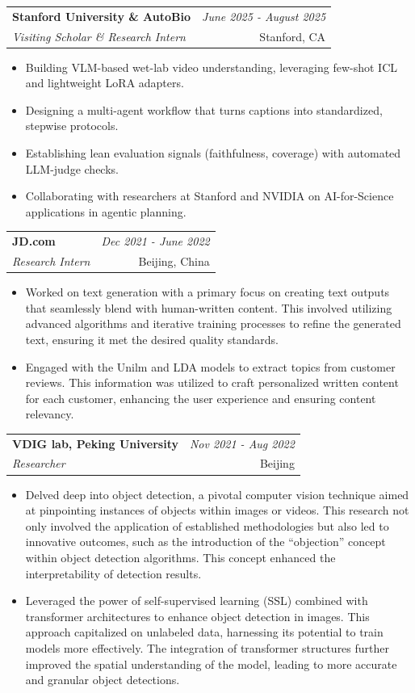 \documentclass[a4paper,11pt]{article}
\makeatletter
\newcommand{\resumeSubheading}[4]{
\vspace{0.5mm}\item
    \begin{tabular*}{0.98\textwidth}[t]{l@{\extracolsep{\fill}}r}
        \textbf{#1} & \textit{\footnotesize{#4}} \\
        \textit{\footnotesize{#3}} &  \footnotesize{#2}\\
    \end{tabular*}
    \vspace{-2.4mm}
}
\newcommand{\resumeItemListStart}{\begin{justify}\begin{itemize}[leftmargin=3ex, rightmargin=2ex, noitemsep,labelsep=1.2mm,itemsep=0mm]\small}
\newcommand{\resumeItemListEnd}{\end{itemize}\end{justify}\vspace{-2mm}}
\makeatother
\begin{document}
  \vspace{-3.0mm}

    \resumeSubheading
      {Stanford University \& AutoBio}{Stanford, CA}
      {Visiting Scholar \& Research Intern}{June 2025 - August 2025}
      \vspace{-2.0mm}
      \resumeItemListStart
        \item Building VLM-based wet-lab video understanding, leveraging few-shot ICL and lightweight LoRA adapters.
        \item Designing a multi-agent workflow that turns captions into standardized, stepwise protocols.
        \item Establishing lean evaluation signals (faithfulness, coverage) with automated LLM-judge checks.
        \item Collaborating with researchers at Stanford and NVIDIA on AI-for-Science applications in agentic planning.
      \resumeItemListEnd

  \vspace{-3.0mm}

    \resumeSubheading
      {JD.com}{Beijing, China}
      {Research Intern}{Dec 2021 - June 2022}
      \vspace{-2.0mm}
      \resumeItemListStart
        \item Worked on text generation with a primary focus on creating text outputs that seamlessly blend with human-written content. This involved utilizing advanced algorithms and iterative training processes to refine the generated text, ensuring it met the desired quality standards.
        \item Engaged with the Unilm and LDA models to extract topics from customer reviews. This information was utilized to craft personalized written content for each customer, enhancing the user experience and ensuring content relevancy.
      \resumeItemListEnd

    \vspace{-3.0mm}

    \resumeSubheading
      {VDIG lab, Peking University}{Beijing}
      {Researcher}{Nov 2021 - Aug 2022}
      \vspace{-2.0mm}
      \resumeItemListStart
        \item Delved deep into object detection, a pivotal computer vision technique aimed at pinpointing instances of objects within images or videos. This research not only involved the application of established methodologies but also led to innovative outcomes, such as the introduction of the ``objection'' concept within object detection algorithms. This concept enhanced the interpretability of detection results.
        \item Leveraged the power of self-supervised learning (SSL) combined with transformer architectures to enhance object detection in images. This approach capitalized on unlabeled data, harnessing its potential to train models more effectively. The integration of transformer structures further improved the spatial understanding of the model, leading to more accurate and granular object detections.
      \resumeItemListEnd
\end{document}
